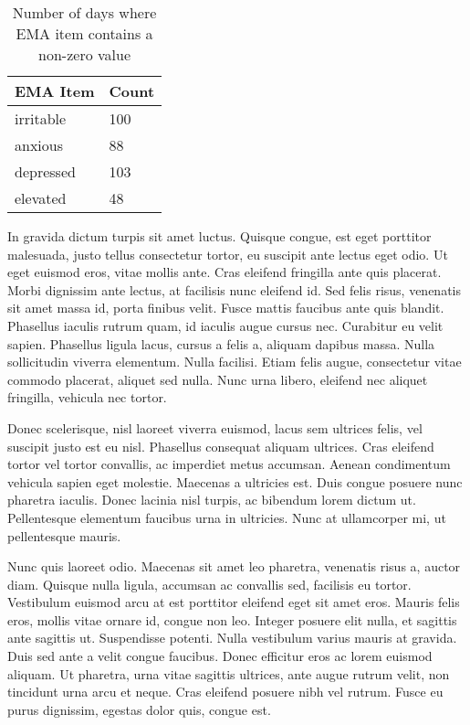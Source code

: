 \documentclass{article}
\begin{document}
\begin{table}[h]
    \centering
    \begin{tabular}{ll}
    \toprule
        \textbf{EMA Item} & \textbf{Count} \\ \midrule
        irritable & 100 \\
        anxious & 88  \\
        depressed & 103  \\
        elevated & 48  \\
        \bottomrule
    \end{tabular}
\caption{Number of days where EMA item contains a non-zero value}
\label{EMA}
\end{table}

In gravida dictum turpis sit amet luctus. Quisque congue, est eget
porttitor malesuada, justo tellus consectetur tortor, eu suscipit ante
lectus eget odio. Ut eget euismod eros, vitae mollis ante. Cras eleifend
fringilla ante quis placerat. Morbi dignissim ante lectus, at facilisis
nunc eleifend id. Sed felis risus, venenatis sit amet massa id, porta
finibus velit. Fusce mattis faucibus ante quis blandit. Phasellus
iaculis rutrum quam, id iaculis augue cursus nec. Curabitur eu velit
sapien. Phasellus ligula lacus, cursus a felis a, aliquam dapibus massa.
Nulla sollicitudin viverra elementum. Nulla facilisi. Etiam felis augue,
consectetur vitae commodo placerat, aliquet sed nulla. Nunc urna libero,
eleifend nec aliquet fringilla, vehicula nec tortor.

Donec scelerisque, nisl laoreet viverra euismod, lacus sem ultrices
felis, vel suscipit justo est eu nisl. Phasellus consequat aliquam
ultrices. Cras eleifend tortor vel tortor convallis, ac imperdiet metus
accumsan. Aenean condimentum vehicula sapien eget molestie. Maecenas a
ultricies est. Duis congue posuere nunc pharetra iaculis. Donec lacinia
nisl turpis, ac bibendum lorem dictum ut. Pellentesque elementum
faucibus urna in ultricies. Nunc at ullamcorper mi, ut pellentesque
mauris.

Nunc quis laoreet odio. Maecenas sit amet leo pharetra, venenatis risus
a, auctor diam. Quisque nulla ligula, accumsan ac convallis sed,
facilisis eu tortor. Vestibulum euismod arcu at est porttitor eleifend
eget sit amet eros. Mauris felis eros, mollis vitae ornare id, congue
non leo. Integer posuere elit nulla, et sagittis ante sagittis ut.
Suspendisse potenti. Nulla vestibulum varius mauris at gravida. Duis sed
ante a velit congue faucibus. Donec efficitur eros ac lorem euismod
aliquam. Ut pharetra, urna vitae sagittis ultrices, ante augue rutrum
velit, non tincidunt urna arcu et neque. Cras eleifend posuere nibh vel
rutrum. Fusce eu purus dignissim, egestas dolor quis, congue est.
\end{document}
